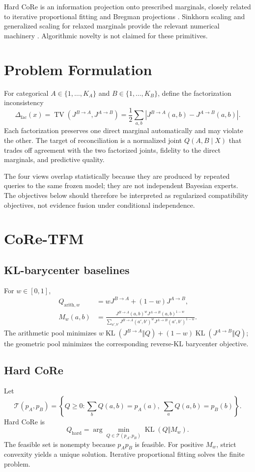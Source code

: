 \documentclass[twoside,11pt]{article}
\newcommand{\TV}{\operatorname{TV}}
\newcommand{\KL}{\operatorname{KL}}
\newcommand{\Jone}{J^{B\rightarrow A}}
\newcommand{\Jtwo}{J^{A\rightarrow B}}
\newcommand{\Qhard}{Q_{\mathrm{hard}}}
\begin{document}
Hard CoRe is an information projection onto prescribed marginals, closely related to iterative proportional fitting and Bregman projections \citep{benamou2015bregman}. Sinkhorn scaling and generalized scaling for relaxed marginals provide the relevant numerical machinery \citep{cuturi2013sinkhorn,chizat2018scaling}. Algorithmic novelty is not claimed for these primitives.

\section{Problem Formulation}
For categorical $A\in\{1,\ldots,K_A\}$ and $B\in\{1,\ldots,K_B\}$, define the factorization inconsistency
\begin{equation}
\Delta_{\mathrm{fac}}(x)=\TV(\Jone,\Jtwo)=\frac12\sum_{a,b}|\Jone(a,b)-\Jtwo(a,b)|.
\end{equation}
Each factorization preserves one direct marginal automatically and may violate the other. The target of reconciliation is a normalized joint $Q(A,B\mid X)$ that trades off agreement with the two factorized joints, fidelity to the direct marginals, and predictive quality.

The four views overlap statistically because they are produced by repeated queries to the same frozen model; they are not independent Bayesian experts. The objectives below should therefore be interpreted as regularized compatibility objectives, not evidence fusion under conditional independence.

\section{CoRe-TFM}
\subsection{KL-barycenter baselines}
For $w\in[0,1]$,
\begin{align}
Q_{\mathrm{arith},w}&=w\Jone+(1-w)\Jtwo,\\
M_w(a,b)&=\frac{\Jone(a,b)^w\Jtwo(a,b)^{1-w}}{\sum_{a',b'}\Jone(a',b')^w\Jtwo(a',b')^{1-w}}.
\end{align}
The arithmetic pool minimizes $w\KL(\Jone\Vert Q)+(1-w)\KL(\Jtwo\Vert Q)$; the geometric pool minimizes the corresponding reverse-KL barycenter objective.

\subsection{Hard CoRe}
Let
\begin{equation}
\mathcal{T}(p_A,p_B)=\left\{Q\ge0:\sum_bQ(a,b)=p_A(a),\;\sum_aQ(a,b)=p_B(b)\right\}.
\end{equation}
Hard CoRe is
\begin{equation}
\Qhard=\arg\min_{Q\in\mathcal{T}(p_A,p_B)}\KL(Q\Vert M_w).
\end{equation}
The feasible set is nonempty because $p_Ap_B$ is feasible. For positive $M_w$, strict convexity yields a unique solution. Iterative proportional fitting solves the finite problem.
\end{document}

